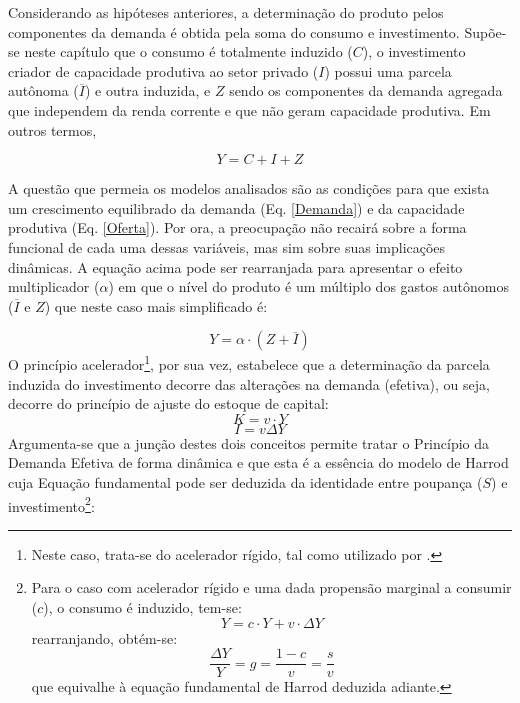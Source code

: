 Considerando as hipóteses anteriores, a determinação do produto pelos componentes da demanda é obtida pela soma do consumo e investimento. Supõe-se neste capítulo que o consumo é totalmente induzido ($C$), o investimento criador de capacidade produtiva ao setor privado ($I$) possui uma parcela autônoma ($\overline I$) e outra induzida, e $Z$ sendo os componentes da demanda agregada que independem da renda corrente e que não geram capacidade produtiva. Em outros termos,

\begin{equation}
\label{Demanda}
    Y = C + I + Z
\end{equation}

A questão que permeia os modelos analisados são as condições para que exista um crescimento equilibrado da demanda (Eq. \ref{Demanda}) e da capacidade produtiva (Eq. \ref{Oferta}). Por ora, a preocupação não recairá sobre a forma funcional de cada uma dessas variáveis, mas sim sobre suas implicações dinâmicas. A equação acima pode ser rearranjada para apresentar o efeito multiplicador ($\alpha$) em que o nível do produto é um múltiplo dos gastos autônomos ($\overline I$ e $Z$) que neste caso mais simplificado é:

\begin{equation}
    Y = \alpha\cdot (Z + \overline I)
\end{equation}
O princípio acelerador\footnote{Neste caso, trata-se do acelerador rígido, tal como utilizado por \textcite{harrod_essay_1939}.}, por sua vez, estabelece que a determinação da parcela induzida do investimento decorre das alterações na demanda (efetiva), ou seja, decorre do princípio de ajuste do estoque de capital:
$$
K = v\cdot Y
$$
\begin{equation}
    I = v\Delta Y
\end{equation}
Argumenta-se que a junção destes dois conceitos permite tratar o Princípio da Demanda Efetiva de forma dinâmica e que esta é a essência do modelo de Harrod cuja Equação fundamental pode ser deduzida da identidade entre poupança ($S$) e investimento\footnote{Para o caso com acelerador rígido e uma dada propensão marginal a consumir ($c$), o consumo é induzido, tem-se:
$$
Y = c\cdot Y + v\cdot \Delta Y
$$
rearranjando, obtém-se:
$$
\frac{\Delta Y}{Y} = g = \frac{1 - c}{v} = \frac{s}{v}
$$
que equivalhe à equação fundamental de Harrod deduzida adiante.
}:

